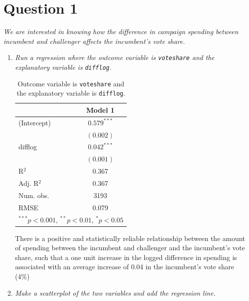 \documentclass[12pt,letterpaper]{article}
\begin{document}
	\section*{Question 1}
	\vspace{.25cm}
	\noindent \emph{We are interested in knowing how the difference in campaign spending between incumbent and challenger affects the incumbent's vote share. }
	\begin{enumerate}
		\item \emph{Run a regression where the outcome variable is \texttt{voteshare} and the explanatory variable is \texttt{difflog}.	}\vspace{.25cm}
			  
			\clearpage

\begin{table}
\begin{center}
	\caption{\footnotesize{Outcome variable is \texttt{voteshare} and the explanatory variable is \texttt{difflog}.}} %
	\label{table:coefficients}
\begin{tabular}{l c }
\hline
 & Model 1 \\
\hline
(Intercept) & $0.579^{***}$ \\
            & $(0.002)$     \\
difflog     & $0.042^{***}$ \\
            & $(0.001)$     \\
\hline
R$^2$       & 0.367         \\
Adj. R$^2$  & 0.367         \\
Num. obs.   & 3193          \\
RMSE        & 0.079         \\
\hline
\multicolumn{2}{l}{\scriptsize{$^{***}p<0.001$, $^{**}p<0.01$, $^*p<0.05$}}
\end{tabular}
\end{center}
\end{table}
		
\vspace{-1cm}
\noindent There is a positive and statistically reliable relationship between the amount of spending between the incumbent and challenger and the incumbent's vote share, such that a one unit increase in the logged difference in spending is associated with an average increase of 0.04 in the incumbent's vote share (4\%)	\vspace{.25cm}
		
		\item \emph{Make a scatterplot of the two variables and add the regression line. }	\vspace{.25cm}
		

\end{enumerate}
\end{document}
